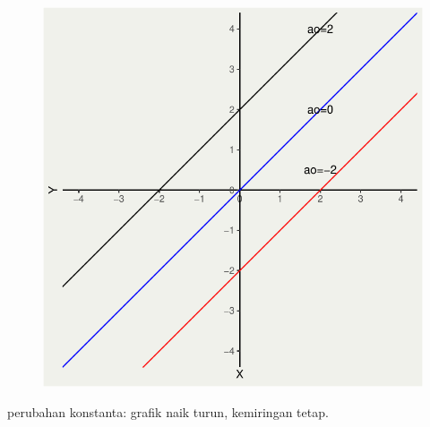 \documentclass[
  letterpaper,
  DIV=11,
  numbers=noendperiod]{scrartcl}
\begin{document}
\begin{figure}[H]

{\centering \includegraphics{index_files/figure-pdf/unnamed-chunk-6-1.pdf}

}

\end{figure}

perubahan konstanta: grafik naik turun, kemiringan tetap.
\end{document}
